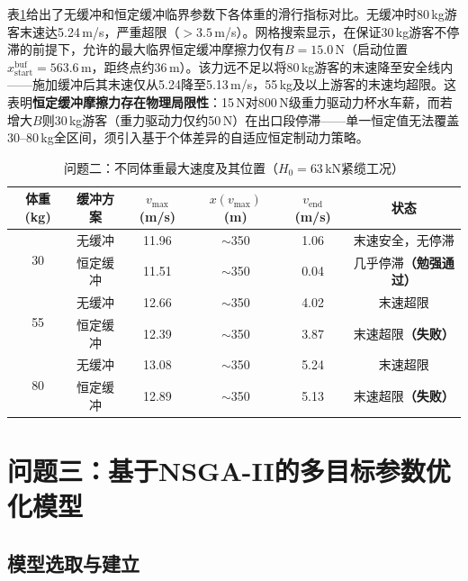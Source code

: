 \documentclass[12pt,a4paper]{ctexart}
\begin{document}
表\ref{tab:prob2_speed}给出了无缓冲和恒定缓冲临界参数下各体重的滑行指标对比。无缓冲时80\,kg游客末速达5.24\,m/s，严重超限（$>3.5$\,m/s）。网格搜索显示，在保证30\,kg游客不停滞的前提下，允许的最大临界恒定缓冲摩擦力仅有$B=15.0$\,N（启动位置$x_{\text{start}}^{\text{buf}}=563.6$\,m，距终点约36\,m）。该力远不足以将80\,kg游客的末速降至安全线内——施加缓冲后其末速仅从5.24降至5.13\,m/s，55\,kg及以上游客的末速均超限。这表明\textbf{恒定缓冲摩擦力存在物理局限性}：15\,N对800\,N级重力驱动力杯水车薪，而若增大$B$则30\,kg游客（重力驱动力仅约50\,N）在出口段停滞——单一恒定值无法覆盖30--80\,kg全区间，须引入基于个体差异的自适应恒定制动力策略。

\begin{table}[H]
  \centering
  \caption{问题二：不同体重最大速度及其位置（$H_0=63$\,kN紧缆工况）}
  \label{tab:prob2_speed}
  \renewcommand{\arraystretch}{1.2}
  \begin{tabular}{c|c|c|c|c|c}
    \toprule
    \textbf{体重 (kg)} & \textbf{缓冲方案} & $v_{\max}$ (m/s) & $x(v_{\max})$ (m) & $v_{\text{end}}$ (m/s) & \textbf{状态} \\
    \midrule
    \multirow{2}{*}{30}
      & 无缓冲 & 11.96 & $\sim$350 & 1.06 & 末速安全，无停滞 \\
      & 恒定缓冲 & 11.51 & $\sim$350 & 0.04 & 几乎停滞\textbf{（勉强通过）} \\
    \midrule
    \multirow{2}{*}{55}
      & 无缓冲 & 12.66 & $\sim$350 & 4.02 & 末速超限 \\
      & 恒定缓冲 & 12.39 & $\sim$350 & 3.87 & 末速超限\textbf{（失败）} \\
    \midrule
    \multirow{2}{*}{80}
      & 无缓冲 & 13.08 & $\sim$350 & 5.24 & 末速超限 \\
      & 恒定缓冲 & 12.89 & $\sim$350 & 5.13 & 末速超限\textbf{（失败）} \\
    \bottomrule
  \end{tabular}
\end{table}


\section{问题三：基于NSGA-II的多目标参数优化模型}

\subsection{模型选取与建立}
\end{document}
